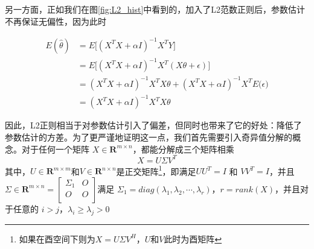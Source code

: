 


另一方面，正如我们在图\ref{fig:L2_hist}中看到的，加入了L2范数正则后，参数估计不再保证无偏性，因为此时

\begin{equation}\label{equ:L2_theta_expect}
\begin{split}
E(\hat{\theta}) &=E\big[(X^TX + \alpha I)^{-1}X^TY\big]\\
&=E\big[(X^TX + \alpha I)^{-1}X^T(X\theta + \epsilon)\big]\\
&=(X^TX + \alpha I)^{-1}X^TX\theta 
	+  (X^TX + \alpha I)^{-1}X^T E\big(\epsilon)\\
&=(X^TX + \alpha I)^{-1}X^TX\theta 
 \end{split}
\end{equation}

因此，L2正则相当于对参数估计引入了偏差，但同时也带来了它的好处：降低了参数估计的方差。为了更严谨地证明这一点，我们首先需要引入奇异值分解的概念。对于任何一个矩阵 $X\in \mathbf{R}^{m\times n}$，都能分解成三个矩阵相乘
\begin{equation}
	X = U\Sigma V^T
\end{equation}
其中，$U \in \mathbf{R}^{m\times m}$和$V \in \mathbf{R}^{n\times n}$是正交矩阵\footnote{如果在酉空间下则为$X = U\Sigma V^H$，$U$和$V$此时为酉矩阵}，即满足$UU^T = I$ 和 $VV^T = I$，并且$\Sigma \in \mathbf{R}^{m\times n} = \begin{bmatrix}
	\Sigma_1 & O\\
	O &  O\\
\end{bmatrix}
$满足 $\Sigma_1 = diag(\lambda_1, \lambda_2, \cdots, \lambda_r)$，$r = rank(X)$，并且对于任意的 $i > j$，$\lambda_i \geq \lambda_j > 0$

